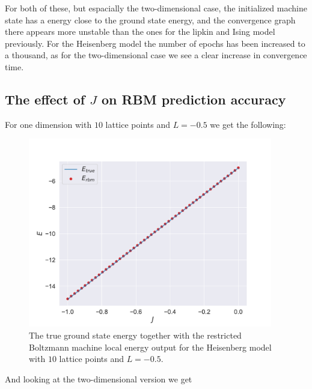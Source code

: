 For both of these, but espacially the two-dimensional case, the initialized machine state has a energy close to the ground state energy, and the convergence graph there appears more unstable than the ones for the lipkin and Ising model previously. For the Heisenberg model the number of epochs has been increased to a thousand, as for the two-dimensional case we see a clear increase in convergence time.

\subsection{The effect of \texorpdfstring{$J$}{J} on RBM prediction accuracy}

For one dimension with $10$ lattice points and $L=-0.5$ we get the following:

\begin{figure}[H]
  \begin{center}
    \includegraphics[width=0.95\textwidth]{Figures/Plots/Heisen/val-true[J][-1.0-0.0][e=500][n=10][N=10][M=1][L=-0.5]}
  \end{center}
  \caption{The true ground state energy together with the restricted Boltzmann machine local energy output for the Heisenberg model with $10$ lattice points and $L=-0.5$.}
\end{figure}

And looking at the two-dimensional version we get


